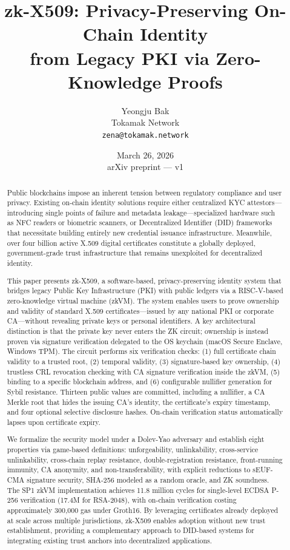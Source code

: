 \documentclass[11pt, a4paper]{article}
\title{zk-X509: Privacy-Preserving On-Chain Identity\\from Legacy PKI via Zero-Knowledge Proofs}
\author{Yeongju Bak\\
Tokamak Network\\
\texttt{zena@tokamak.network}}
\date{March 26, 2026\\{\small arXiv preprint --- v1}}
\begin{document}
\maketitle


\begin{abstract}

Public blockchains impose an inherent tension between regulatory
compliance and user privacy. Existing on-chain identity solutions
require either centralized KYC attestors---introducing single points of
failure and metadata leakage---specialized hardware such as NFC readers
or biometric scanners, or Decentralized Identifier (DID) frameworks that
necessitate building entirely new credential issuance infrastructure.
Meanwhile, over four billion active X.509 digital certificates
constitute a globally deployed, government-grade trust infrastructure
that remains unexploited for decentralized identity.

This paper presents zk-X509, a software-based, privacy-preserving
identity system that bridges legacy Public Key Infrastructure (PKI) with
public ledgers via a RISC-V-based zero-knowledge virtual machine (zkVM).
The system enables users to prove ownership and validity of standard
X.509 certificates---issued by any national PKI or corporate
CA---without revealing private keys or personal identifiers. A key
architectural distinction is that the private key never enters the ZK
circuit; ownership is instead proven via signature verification
delegated to the OS keychain (macOS Secure Enclave, Windows TPM). The
circuit performs six verification checks: (1) full certificate chain validity to
a trusted root, (2) temporal validity, (3) signature-based key
ownership, (4) trustless CRL revocation checking with CA signature
verification inside the zkVM, (5) binding to a specific blockchain
address, and (6) configurable nullifier generation for Sybil resistance.
Thirteen public values are committed, including a nullifier, a CA Merkle
root that hides the issuing CA's identity, the certificate's expiry
timestamp, and four optional selective disclosure hashes. On-chain
verification status automatically lapses upon certificate expiry.

We formalize the security model under a Dolev-Yao adversary and
establish eight properties via game-based definitions: unforgeability,
unlinkability, cross-service unlinkability, cross-chain replay resistance, double-registration resistance, front-running immunity,
CA anonymity, and non-transferability, with explicit reductions to
sEUF-CMA signature security, SHA-256 modeled as a random oracle, and ZK
soundness. The SP1 zkVM implementation achieves 11.8 million cycles for
single-level ECDSA P-256 verification (17.4M for RSA-2048), with
on-chain verification costing approximately 300,000 gas under Groth16.
By leveraging certificates already deployed at scale across multiple
jurisdictions, zk-X509 enables adoption without new trust establishment,
providing a complementary approach to DID-based systems for integrating
existing trust anchors into decentralized applications.
\end{abstract}
\end{document}

